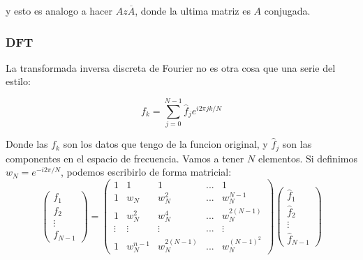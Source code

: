 \documentclass[12pt, oneside]{article}
\begin{document}
y esto es analogo a hacer $Az\overline{A}$, donde la ultima matriz es $A$ conjugada.


\subsubsection{DFT}
La transformada inversa discreta de Fourier no es otra cosa que una serie del estilo:

\begin{equation*}
    f_k = \sum_{j=0}^{N-1}\hat{f}_je^{i2\pi j k/N}
\end{equation*}

Donde las $f_k$ son los datos que tengo de la funcion original, y $\hat{f}_j$ son
las componentes en el espacio de frecuencia.
Vamos a tener $N$ elementos.
Si definimos $w_N=e^{-i2\pi/N}$, podemos escribirlo de forma matricial:
\begin{equation*}
    \begin{pmatrix}
         f_1 \\
         f_2 \\
        \vdots \\
          f_{N-1}
    \end{pmatrix}
    =
    \begin{pmatrix}
        1 & 1 &  1 & ... & 1 \\
        1 & w_N &  w_N^2 & ... & w_N^{N-1} \\
        1 & w_N^2 & w_N^4 & ... & w_N^{2(N-1)}\\
        \vdots & \vdots & \vdots & ... & \vdots\\
        1 & w_N^{n-1} & w_N^{2(N-1)} & ... & w_N^{(N-1)^2}
    \end{pmatrix}
    \label{eq:vandermonde}
    \begin{pmatrix}
        \hat{f}_1 \\
         \hat{f}_2 \\
        \vdots \\
          \hat{f}_{N-1}
    \end{pmatrix}
\end{equation*}
\end{document}
